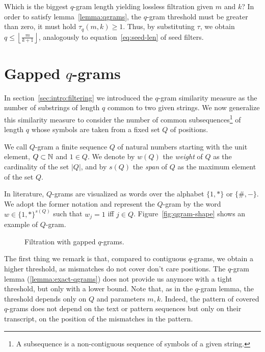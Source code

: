 Which is the biggest $q$-gram length yielding lossless filtration given $m$ and $k$?
In order to satisfy lemma~\ref{lemma:qgrams}, the $q$-gram threshold must be greater than zero, \ie it must hold $\tau_q(m,k) \geq 1$.
Thus, by substituting $\tau$, we obtain $q \leq \left \lfloor \frac{m}{k+1} \right \rfloor$, analogously to equation~\ref{eq:seed-len} of seed filters.


\section{Gapped $q$-grams}

In section~\ref{sec:intro:filtering} we introduced the $q$-gram similarity measure as the number of substrings of length $q$ common to two given strings.
We now generalize this similarity measure to consider the number of common subsequences\footnote{A subsequence is a non-contiguous sequence of symbols of a given string.} of length $q$ whose symbols are taken from a fixed set $Q$ of positions.

\begin{definition}
We call $Q$-gram a finite sequence $Q$ of natural numbers starting with the unit element, \ie $Q \subset \mathbb {N}$ and $1 \in Q$.
We denote by $w(Q)$ the \emph{weight} of $Q$ as the cardinality of the set $|Q|$, and by $s(Q)$ the \emph{span} of $Q$ as the maximum element of the set $Q$.
\end{definition}

In literature, $Q$-grams are visualized as words over the alphabet $\{1,*\}$ or $\{\#,-\}$.
We adopt the former notation and represent the $Q$-gram by the word $w \in \{1,*\}^{s(Q)}$ such that $w_j=1$ iff $j \in Q$.
Figure~\ref{fig:qgram-shape} shows an example of $Q$-gram.

\begin{figure}[h]
\begin{center}
\caption[Filtration with gapped $q$-grams]{Filtration with gapped $q$-grams.}
\label{fig:qgrams-gapped}

\end{center}
\end{figure}

The first thing we remark is that, compared to contiguous $q$-grams, we obtain a higher threshold, as mismatches do not cover don't care positions.
The $q$-gram lemma (\ref{lemma:exact-qgrams}) does not provide us anymore with a tight threshold, but only with a lower bound.
Note that, as in the $q$-gram lemma, the threshold depends only on $Q$ and parameters $m,k$.
Indeed, the pattern of covered $q$-grams does not depend on the text or pattern sequences but only on their transcript, \ie on the position of the mismatches in the pattern.

